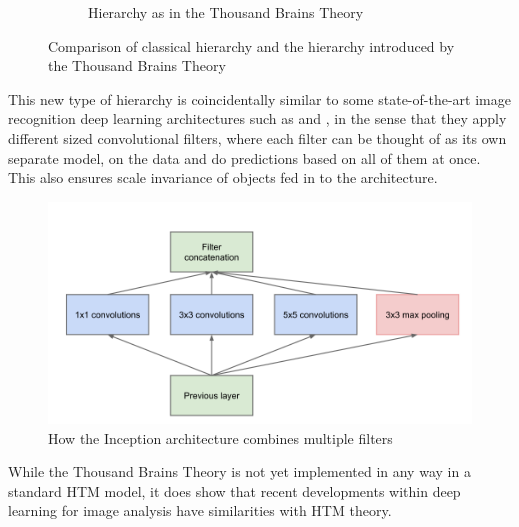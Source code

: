 \begin{figure}[H]
\begin{subfigure}[t]{0.3\textwidth}
        \caption{Hierarchy as in the Thousand Brains Theory}
        \label{}
    \end{subfigure}
    \caption{Comparison of classical hierarchy and the hierarchy introduced by the Thousand Brains Theory}
\end{figure}
This new type of hierarchy is coincidentally similar to some state-of-the-art image recognition deep learning architectures such as \cite{fpn} and \cite{inceptionnet}, in the sense that they apply different sized convolutional filters, where each filter can be thought of as its own separate model, on the data and do predictions based on all of them at once. This also ensures scale invariance of objects fed in to the architecture.
\begin{figure}[H]
    \centering
    \includegraphics[width=\linewidth]{resources/models/inception_module.png}
    \caption{How the Inception \cite{inceptionnet} architecture combines multiple filters}
    \label{fig:inception_module}
\end{figure}
While the Thousand Brains Theory is not yet implemented in any way in a standard HTM model, it does show that recent developments within deep learning for image analysis have similarities with HTM theory.
